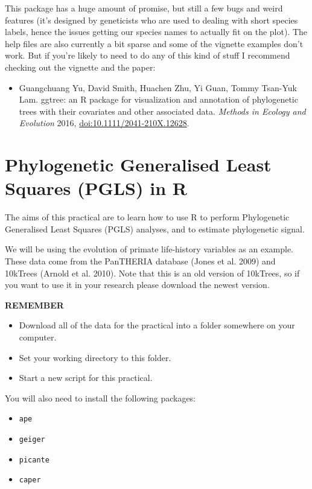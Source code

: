 \documentclass[]{book}
\providecommand{\tightlist}{%
  \setlength{\itemsep}{0pt}\setlength{\parskip}{0pt}}
\begin{document}
This package has a huge amount of promise, but still a few bugs and
weird features (it's designed by geneticists who are used to dealing
with short species labels, hence the issues getting our species names to
actually fit on the plot). The help files are also currently a bit
sparse and some of the vignette examples don't work. But if you're
likely to need to do any of this kind of stuff I recommend checking out
the vignette and the paper:

\begin{itemize}
\tightlist
\item
  Guangchuang Yu, David Smith, Huachen Zhu, Yi Guan, Tommy Tsan-Yuk Lam.
  ggtree: an R package for visualization and annotation of phylogenetic
  trees with their covariates and other associated data. \emph{Methods
  in Ecology and Evolution} 2016, \url{doi:10.1111/2041-210X.12628}.
\end{itemize}

\chapter{Phylogenetic Generalised Least Squares (PGLS) in
R}\label{phylogenetic-generalised-least-squares-pgls-in-r}

The aims of this practical are to learn how to use R to perform
Phylogenetic Generalised Least Squares (PGLS) analyses, and to estimate
phylogenetic signal.

We will be using the evolution of primate life-history variables as an
example. These data come from the PanTHERIA database (Jones et al. 2009)
and 10kTrees (Arnold et al. 2010). Note that this is an old version of
10kTrees, so if you want to use it in your research please download the
newest version.

\textbf{REMEMBER}

\begin{itemize}
\tightlist
\item
  Download all of the data for the practical into a folder somewhere on
  your computer.
\item
  Set your working directory to this folder.
\item
  Start a new script for this practical.
\end{itemize}

You will also need to install the following packages:

\begin{itemize}
\tightlist
\item
  \texttt{ape}
\item
  \texttt{geiger}
\item
  \texttt{picante}
\item
  \texttt{caper}
\end{itemize}
\end{document}
